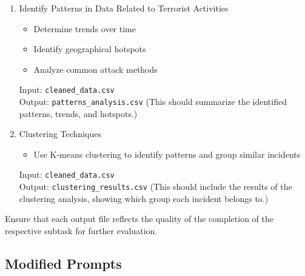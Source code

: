 \begin{itemize}
\begin{tcolorbox}[colback=blue!5!white, colframe=blue!75!black, title=Qualified Prompt 2:, text width=\textwidth]
\begin{enumerate}
    \item Identify Patterns in Data Related to Terrorist Activities 
    \begin{itemize}
        \item Determine trends over time
        \item Identify geographical hotspots
        \item Analyze common attack methods
    \end{itemize}
    Input: \texttt{cleaned\_data.csv} \\
    Output: \texttt{patterns\_analysis.csv} (This should summarize the identified patterns, trends, and hotspots.)
    
    \item Clustering Techniques 
    \begin{itemize}
        \item Use K-means clustering to identify patterns and group similar incidents
    \end{itemize}
    Input: \texttt{cleaned\_data.csv} \\
    Output: \texttt{clustering\_results.csv} (This should include the results of the clustering analysis, showing which group each incident belongs to.)
\end{enumerate}

Ensure that each output file reflects the quality of the completion of the respective subtask for further evaluation.
\end{tcolorbox}
    
\end{itemize}


\clearpage\newpage


\subsection{Modified Prompts}

